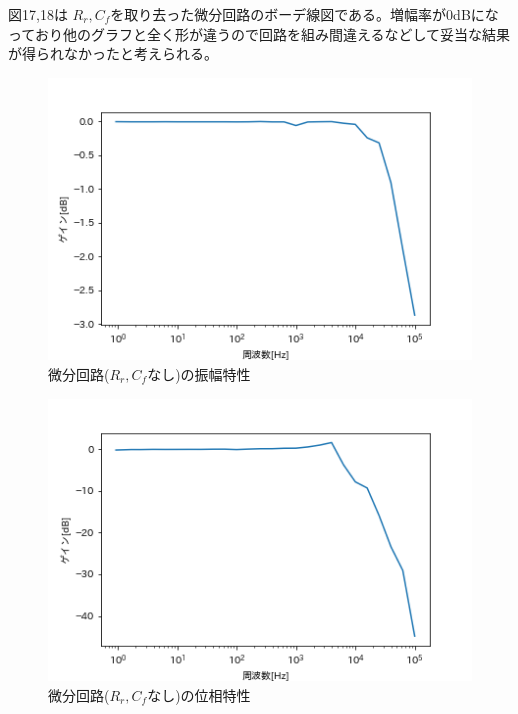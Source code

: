 \documentclass[dvipdfmx, twocolumn]{jsarticle}
\begin{document}
\begin{enumerate}
\begin{itemize}
図17,18は $R_{r}, C_{f}$を取り去った微分回路のボーデ線図である。増幅率が0dBになっており他のグラフと全く形が違うので回路を組み間違えるなどして妥当な結果が得られなかったと考えられる。
\begin{figure}[H]
\begin{center}
\includegraphics[scale = 0.5]{dG.png}
\caption{微分回路($R_{r}, C_{f}なし$)の振幅特性}
\end{center}
\end{figure}

\begin{figure}[H]
\begin{center}
\includegraphics[scale = 0.5]{dP.png}
\caption{微分回路($R_{r}, C_{f}なし$)の位相特性}
\end{center}
\end{figure}


\end{itemize}
\end{enumerate}
\end{document}
